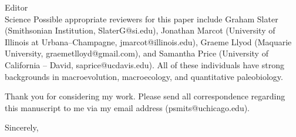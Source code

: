 \documentclass{letter}
\begin{document}
\begin{letter}{Editor \\ Science}
  Possible appropriate reviewers for this paper include Graham Slater (Smithsonian Institution, SlaterG@si.edu), Jonathan Marcot (University of Illinois at Urbana--Champagne, jmarcot@illinois.edu), Graeme Llyod (Maquarie University, graemetlloyd@gmail.com), and Samantha Price (University of California -- David, saprice@ucdavis.edu). All of these individuals have strong backgrounds in macroevolution, macroecology, and quantitative paleobiology. 

  Thank you for considering my work. Please send all correspondence regarding this manuscript to me via my email address (psmits@uchicago.edu).

  \closing{Sincerely,}

\end{letter}
\end{document}

